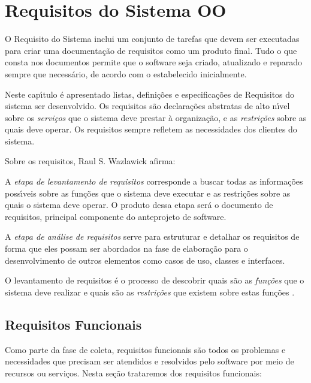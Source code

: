 


\chapter{Requisitos do Sistema OO}

O Requisito do Sistema inclui um conjunto de tarefas que devem ser executadas para criar uma documentação de requisitos como um produto final. Tudo o que consta nos documentos permite que o software seja criado, atualizado e reparado sempre que necessário, de acordo com o estabelecido inicialmente.



Neste cap\'{\i}tulo \'{e} apresentado listas, defini\c{c}\~{o}es e especifica\c{c}\~{o}es de Requisitos do sistema ser desenvolvido. Os requisitos s\~{a}o declara\c{c}\~{o}es abstratas de alto n\'{\i}vel sobre os \textit{servi\c{c}os} que o sistema deve prestar \`{a} organiza\c{c}\~{a}o, e as \textit{restri\c{c}\~{o}es} sobre as quais deve operar. Os requisitos sempre refletem as necessidades dos clientes do sistema.

Sobre os requisitos,  Raul S. Wazlawick afirma:
\begin{citadireta}
  A \textit{etapa de levantamento de requisitos} corresponde a buscar todas as informa\c{c}\~{o}es poss\'{\i}veis sobre as fun\c{c}\~{o}es que o sistema deve executar e as restri\c{c}\~{o}es sobre as quais o sistema deve operar. O produto dessa etapa ser\'{a} o documento de requisitos, principal componente do anteprojeto de software.

  A \textit{etapa de an\'{a}lise de requisitos} serve para estruturar e detalhar os requisitos de forma que eles possam ser abordados na fase de elabora\c{c}\~{a}o para o desenvolvimento  de outros elementos como casos de uso, classes e interfaces.

  O levantamento de requisitos \'{e} o processo de descobrir quais s\~{a}o as \textit{fun\c{c}\~{o}es} que o sistema deve realizar e quais s\~{a}o as \textit{restri\c{c}\~{o}es} que existem sobre estas fun\c{c}\~{o}es  \cite{Wazlawick2011}.
\end{citadireta}



\section{ Requisitos Funcionais}
Como parte da fase de coleta, requisitos funcionais são todos os problemas e necessidades que precisam ser atendidos e resolvidos pelo software por meio de recursos ou serviços. Nesta seção trataremos dos requisitos funcionais:

